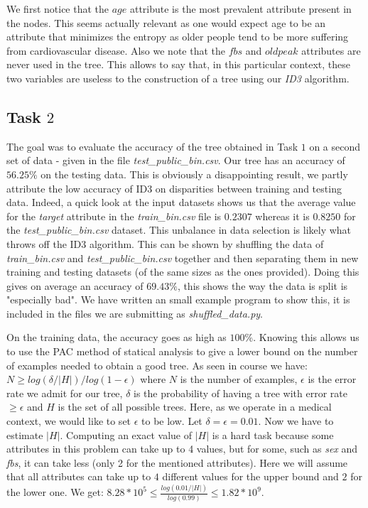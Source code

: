 \documentclass[9pt]{extarticle}
\begin{document}
	We first notice that the $age$ attribute is the most prevalent attribute present in the nodes. This seems actually relevant as one would expect age to be an attribute that minimizes the entropy as older people tend to be more suffering from cardiovascular disease. Also we note that the $fbs$ and $oldpeak$ attributes are never used in the tree. This allows to say that, in this particular context, these two variables are useless to the construction of a tree using our \emph{ID3} algorithm.
		
		
\subsection{Task $2$}
	The goal was to evaluate the accuracy of the tree obtained in Task $1$ on a second set of data - given in the file \emph{test\_public\_bin.csv}.
	Our tree has an accuracy of $56.25\%$ on the testing data. This is obviously a disappointing result, we partly attribute the low accuracy of ID3 on disparities between training and testing data. Indeed, a quick look at the input datasets shows us that the average value for the \emph{target} attribute in the \emph{train\_bin.csv} file is $0.2307$ whereas it is $0.8250$ for the \emph{test\_public\_bin.csv} dataset. This unbalance in data selection is likely what throws off the ID3 algorithm. This can be shown by shuffling the data of \emph{train\_bin.csv} and \emph{test\_public\_bin.csv} together and then separating them in new training and testing datasets (of the same sizes as the ones provided). Doing this gives on average an accuracy of $69.43\%$, this shows the way the data is split is "especially bad". We have written an small example program to show this, it is included in the files we are submitting as \emph{shuffled\_data.py}.
	
	On the training data, the accuracy goes as high as $100\%$. Knowing this allows us to use the PAC method of statical analysis to give a lower bound on the number of examples needed to obtain a good tree. As seen in course we have:
	$N\geq{log(\delta/|H|)}/{log(1-\epsilon)}$
where $N$ is the number of examples, $\epsilon$ is the error rate we admit for our tree, $\delta$ is the probability of having a tree with error rate $\geq\epsilon$ and $H$ is the set of all possible trees. Here, as we operate in a medical context, we would like to set $\epsilon$  to be low. Let $\delta=\epsilon= 0.01$. Now we have to estimate $|H|$. Computing an exact value of $|H|$ is a hard task because some attributes in this problem can take up to 4 values, but for some, such as \emph{sex} and \emph{fbs}, it can take less (only 2 for the mentioned attributes). Here we will assume that all attributes can take up to $4$ different values for the upper bound and $2$ for the lower one. We get: $8.28*10^5\leq\frac{log(0.01/|H|)}{log(0.99)}\leq1.82*10^9.$ \\
	
\end{document}
